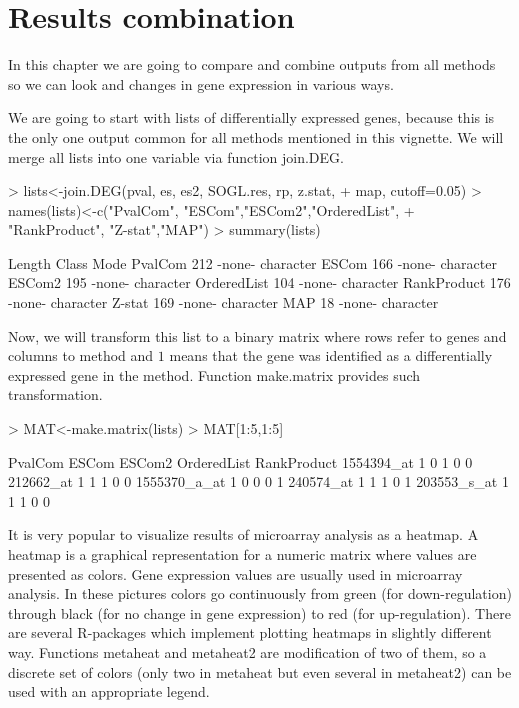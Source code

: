 \documentclass[a4paper]{report}
\begin{document}
\chapter{Results combination}
In this chapter we are going to compare and combine outputs from all methods so we can look and changes in gene expression in various ways. \par
We are going to start with lists of differentially expressed genes, because this is the only one output common for all methods mentioned in this vignette. We will merge all lists into one variable via function {\ttfamily join.DEG}.
\begin{Schunk}
\begin{Sinput}
> lists<-join.DEG(pval, es, es2, SOGL.res, rp, z.stat,
+   map,  cutoff=0.05)
> names(lists)<-c("PvalCom", "ESCom","ESCom2","OrderedList",
+ "RankProduct", "Z-stat","MAP")
> summary(lists)
\end{Sinput}
\begin{Soutput}
            Length Class  Mode     
PvalCom     212    -none- character
ESCom       166    -none- character
ESCom2      195    -none- character
OrderedList 104    -none- character
RankProduct 176    -none- character
Z-stat      169    -none- character
MAP          18    -none- character
\end{Soutput}
\end{Schunk}
Now, we will transform this list to a binary matrix where rows refer to genes and columns to method and $1$ means that the gene was identified as a differentially expressed gene in the method. Function {\ttfamily make.matrix} provides such transformation.  
\begin{Schunk}
\begin{Sinput}
> MAT<-make.matrix(lists)
> MAT[1:5,1:5]
\end{Sinput}
\begin{Soutput}
             PvalCom ESCom ESCom2 OrderedList RankProduct
1554394_at         1     0      1           0           0
212662_at          1     1      1           0           0
1555370_a_at       1     0      0           0           1
240574_at          1     1      1           0           1
203553_s_at        1     1      1           0           0
\end{Soutput}
\end{Schunk}
It is very popular to visualize results of microarray analysis as a heatmap. A heatmap is a graphical representation for a numeric matrix where values are presented as colors. Gene expression values are usually used in microarray analysis. In these pictures colors go continuously from green (for down-regulation) through black (for no change in gene expression) to red (for up-regulation). There are several R-packages which implement plotting heatmaps in slightly different way. Functions {\ttfamily metaheat} and {\ttfamily metaheat2} are modification of two of them, so a discrete set of colors (only two in {\ttfamily metaheat} but even several in {\ttfamily metaheat2}) can be used with an appropriate legend.\par
\end{document}

